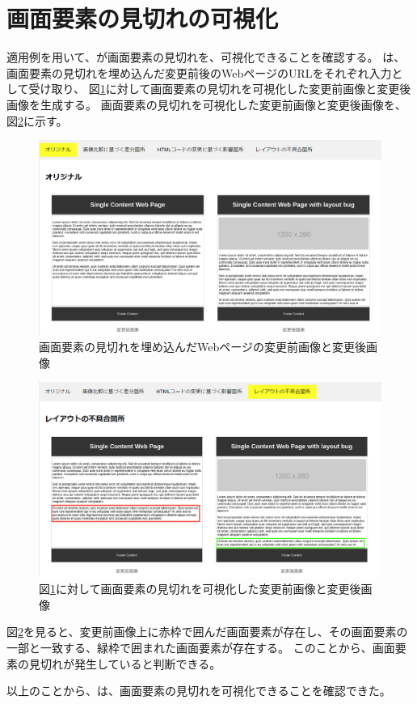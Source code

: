 \section{画面要素の見切れの可視化}\label{sec:result_area_detec}
適用例を用いて、\toolName が画面要素の見切れを、可視化できることを確認する。
\toolName は、画面要素の見切れを埋め込んだ変更前後のWebページのURLをそれぞれ入力として受け取り、
図\ref{fig: ex4_original}に対して画面要素の見切れを可視化した変更前画像と変更後画像を生成する。
画面要素の見切れを可視化した変更前画像と変更後画像を、図\ref{fig: ex4_subeffect}に示す。
\begin{figure}[tp]
    \begin{center}
        \includegraphics[width=1.0\columnwidth]{image/5/ex4_original.png}
        \caption{画面要素の見切れを埋め込んだWebページの変更前画像と変更後画像}
        \label{fig: ex4_original}
    \end{center}
\end{figure}
\begin{figure}[tp]
    \begin{center}
        \includegraphics[width=1.0\columnwidth]{image/5/ex4_subeffect.png}
        \caption{図\ref{fig: ex4_original}に対して画面要素の見切れを可視化した変更前画像と変更後画像}
        \label{fig: ex4_subeffect}
    \end{center}
\end{figure}
図\ref{fig: ex4_subeffect}を見ると、変更前画像上に赤枠で囲んだ画面要素が存在し、その画面要素の一部と一致する、緑枠で囲まれた画面要素が存在する。
このことから、画面要素の見切れが発生していると判断できる。
\par
以上のことから、\toolName は、画面要素の見切れを可視化できることを確認できた。

